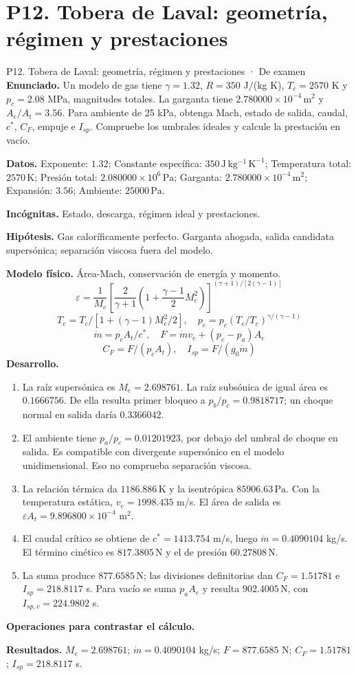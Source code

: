 \section{P12. Tobera de Laval: geometría, régimen y prestaciones}
\begin{studiumworked}{P12. Tobera de Laval: geometría, régimen y prestaciones · De examen}
\textbf{Enunciado.} Un modelo de gas tiene $\gamma=1.32$, $R=350$ J/(kg K), $T_c=2570$ K y $p_c=2.08$ MPa, magnitudes totales. La garganta tiene $2.780000\times10^{-4}\,\mathrm{m^2}$ y $A_e/A_t=3.56$. Para ambiente de 25 kPa, obtenga Mach, estado de salida, caudal, $c^*$, $C_F$, empuje e $I_{sp}$. Compruebe los umbrales ideales y calcule la prestación en vacío.

\textbf{Datos.} Exponente: $1.32$; Constante específica: $350\,\mathrm{J\,kg^{-1}\,K^{-1}}$; Temperatura total: $2570\,\mathrm{K}$; Presión total: $2.080000\times10^{6}\,\mathrm{Pa}$; Garganta: $2.780000\times10^{-4}\,\mathrm{m^2}$; Expansión: $3.56$; Ambiente: $25000\,\mathrm{Pa}$.

\textbf{Incógnitas.} Estado, descarga, régimen ideal y prestaciones.

\textbf{Hipótesis.} Gas caloríficamente perfecto. Garganta ahogada, salida candidata supersónica; separación viscosa fuera del modelo.

\textbf{Modelo físico.} Área-Mach, conservación de energía y momento.
\[\varepsilon=\frac1{M_e}\left[\frac2{\gamma+1}(1+\frac{\gamma-1}2M_e^2)\right]^{(\gamma+1)/[2(\gamma-1)]}\]
\[T_e=T_c/[1+(\gamma-1)M_e^2/2],\quad p_e=p_c(T_e/T_c)^{\gamma/(\gamma-1)}\]
\[\dot m=p_cA_t/c^*,\quad F=\dot m v_e+(p_e-p_a)A_e\]
\[C_F=F/(p_cA_t),\quad I_{sp}=F/(g_0\dot m)\]
\textbf{Desarrollo.}
\begin{enumerate}
\item La raíz supersónica es $M_e=2.698761$. La raíz subsónica de igual área es $0.1666756$. De ella resulta primer bloqueo a $p_b/p_c=0.9818717$; un choque normal en salida daría $0.3366042$.
\item El ambiente tiene $p_a/p_c=0.01201923$, por debajo del umbral de choque en salida. Es compatible con divergente supersónico en el modelo unidimensional. Eso no comprueba separación viscosa.
\item La relación térmica da $1186.886\,\mathrm{K}$ y la isentrópica $85906.63\,\mathrm{Pa}$. Con la temperatura estática, $v_e=1998.435$ m/s. El área de salida es $\varepsilon A_t=9.896800\times10^{-4}$ m$^2$.
\item El caudal crítico se obtiene de $c^*=1413.754$ m/s, luego $\dot m=0.4090104$ kg/s. El término cinético es $817.3805\,\mathrm{N}$ y el de presión $60.27808\,\mathrm{N}$.
\item La suma produce $877.6585\,\mathrm{N}$; las divisiones definitorias dan $C_F=1.51781$ e $I_{sp}=218.8117$ s. Para vacío se suma $p_aA_e$ y resulta $902.4005\,\mathrm{N}$, con $I_{sp,v}=224.9802$ s.
\end{enumerate}
\textbf{Operaciones para contrastar el cálculo.}

\textbf{Resultados.} $M_e=2.698761$; $\dot m=0.4090104$ kg/s; $F=877.6585$ N; $C_F=1.51781$; $I_{sp}=218.8117$ s.


\end{studiumworked}
